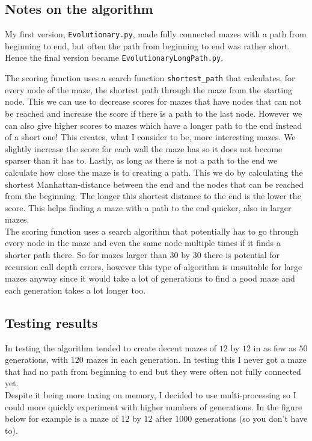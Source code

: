 \documentclass[10pt, a4paper, twoside]{amsart}
\newcommand{\1}{\mathbbm{1}}
\begin{document}
\subsection{Notes on the algorithm}
My first version, \verb+Evolutionary.py+, made fully connected mazes with a path from beginning to end, but often the path from beginning to end was rather short. Hence the final version became \verb+EvolutionaryLongPath.py+.

The scoring function uses a search function \verb+shortest_path+ that calculates, for every node of the maze, the shortest path through the maze from the starting node. This we can use to decrease scores for mazes that have nodes that can not be reached and increase the score if there is a path to the last node. However we can also give higher scores to mazes which have a longer path to the end instead of a short one! This creates, what I consider to be, more interesting mazes. We slightly increase the score for each wall the maze has so it does not become sparser than it has to. Lastly, as long as there is not a path to the end we calculate how close the maze is to creating a path. This we do by calculating the shortest Manhattan-distance between the end and the nodes that can be reached from the beginning. The longer this shortest distance to the end is the lower the score. This helps finding a maze with a path to the end quicker, also in larger mazes.\\

The scoring function uses a search algorithm that potentially has to go through every node in the maze and even the same node multiple times if it finds a shorter path there. So for mazes larger than $30$ by $30$ there is potential for recursion call depth errors, however this type of algorithm is unsuitable for large mazes anyway since it would take a lot of generations to find a good maze and each generation takes a lot longer too.\\


\subsection{Testing results}
In testing the algorithm tended to create decent mazes of $12$ by $12$ in as few as $50$ generations, with $120$ mazes in each generation. In testing this I never got a maze that had no path from beginning to end but they were often not fully connected yet.\\

Despite it being more taxing on memory, I decided to use multi-processing so I could more quickly experiment with higher numbers of generations. In the figure below for example is a maze of $12$ by $12$ after $1000$ generations (so you don't have to). 
\end{document}
